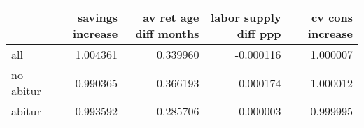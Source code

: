\begin{tabular}{lrrrr}
\toprule
 & savings increase & av ret age diff months & labor supply diff ppp & cv cons increase \\
\midrule
all & 1.004361 & 0.339960 & -0.000116 & 1.000007 \\
no abitur & 0.990365 & 0.366193 & -0.000174 & 1.000012 \\
abitur & 0.993592 & 0.285706 & 0.000003 & 0.999995 \\
\bottomrule
\end{tabular}
